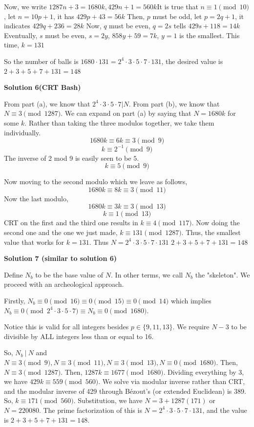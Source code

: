 \begin{enumerate}
 Now, we write $1287n+3=1680k, 429n+1=560k$It is true that $n\equiv 1 \pmod{10}$, let $n=10p+1$, it has $429p+43=56k$ Then, $p$ must be odd, let $p=2q+1$, it indicates $429q+236=28k$ Now, $q$ must be even, $q=2s$ tells $429s+118=14k$ Eventually, $s$ must be even, $s=2y$, $858y+59=7k$, $y=1$ is the smallest. This time, $k=131$

 So the number of balls is $1680\cdot 131=2^4\cdot 3\cdot 5\cdot 7 \cdot 131$, the desired value is $2+3+5+7+131=\boxed{148}$




\textbf{Solution 6(CRT Bash)}

From part (a), we know that $2^4\cdot3\cdot5\cdot7 | N$. From part (b), we know that $N \equiv 3 \pmod {1287}$. We can expand on part (a) by saying that $N = 1680k$ for some $k$. Rather than taking the three modulos together, we take them individually. 
 \[1680k \equiv 6k \equiv 3 \pmod 9\]
 \[k \equiv 2^{-1} \pmod 9\]The inverse of 2 mod 9 is easily seen to be $5$. 
 \[k \equiv 5 \pmod 9\]

 Now moving to the second modulo which we leave as follows,
 \[1680k \equiv 8k \equiv 3 \pmod {11}\]Now the last modulo,
 \[1680k \equiv 3k \equiv 3 \pmod {13}\]
 \[k \equiv 1 \pmod{13}\]CRT on the first and the third one results in $k \equiv 4 \pmod {117}$. Now doing the second one and the one we just made, $k \equiv 131 \pmod{1287}$. Thus, the smallest value that works for $k = 131$. Thus $N = 2^4\cdot3\cdot5\cdot7\cdot131$ $2+3+5+7+131 = \boxed{148}$




\textbf{Solution 7 (similar to solution 6)}

Define $N_b$ to be the base value of $N$. In other terms, we call $N_b$ the "skeleton". We proceed with an archeological approach.

 Firstly, $N_b \equiv 0 \pmod{16} \equiv 0 \pmod{15} \equiv 0 \pmod{14}$ which implies $N_b \equiv 0 \pmod{2^4 \cdot 3 \cdot 5 \cdot 7} \equiv N_b \equiv 0 \pmod{1680}$.

 Notice this is valid for all integers besides $p \in \{9,11,13 \}$. We require $N-3$ to be divisible by ALL integers less than or equal to 16. 

 So, $N_b \ | \ N$ and $N \equiv 3 \pmod{9}, N \equiv 3 \pmod{11}, N \equiv 3 \pmod{13}, N \equiv 0 \pmod{1680}$. Then, $N \equiv 3 \pmod{1287}$. Then, $1287k \equiv 1677 \pmod{1680}$. Dividing everything by 3, we have $429k \equiv 559 \pmod{560}$. We solve via modular inverse rather than CRT, and the modular inverse of 429 through Bézout’s (or extended Euclidean) is 389. So, $k \equiv 171 \pmod{560}$. Substitution, we have $N = 3 + 1287(171)$ or $N = 220080$. The prime factorization of this is $N = 2^4\cdot3\cdot5\cdot7\cdot131$, and the value is $2+3+5+7+131= \boxed{148}$.


\end{enumerate}
